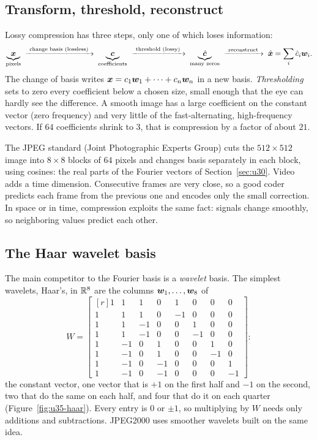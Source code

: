 \subsection{Transform, threshold, reconstruct}

Lossy compression has three steps, only one of which loses information:
\[
  \underbrace{\boldsymbol{x}}_{\text{pixels}}
  \;\xrightarrow{\ \text{change basis (lossless)}\ }\;
  \underbrace{\boldsymbol{c}}_{\text{coefficients}}
  \;\xrightarrow{\ \text{threshold (lossy)}\ }\;
  \underbrace{\hat{\boldsymbol{c}}}_{\text{many zeros}}
  \;\xrightarrow{\ \text{reconstruct}\ }\;
  \hat{\boldsymbol{x}}=\sum_i\hat c_i\boldsymbol{w}_i .
\]
The change of basis writes $\boldsymbol{x}=c_1\boldsymbol{w}_1+\cdots+c_n\boldsymbol{w}_n$ in a new basis. \emph{Thresholding} sets
to zero every coefficient below a chosen size, small enough that the eye can hardly see the
difference. A smooth image has a large coefficient on the constant vector (zero frequency) and
very little of the fast-alternating, high-frequency vectors. If $64$ coefficients shrink to $3$,
that is compression by a factor of about $21$.

The JPEG standard (Joint Photographic Experts Group) cuts the $512\times512$ image into $8\times8$
blocks of $64$ pixels and changes basis separately in each block, using cosines: the real parts
of the Fourier vectors of Section~\ref{sec:u30}. Video adds a time dimension. Consecutive frames
are very close, so a good coder predicts each frame from the previous one and encodes only the
small correction. In space or in time, compression exploits the same fact: signals change
smoothly, so neighboring values predict each other.

\subsection{The Haar wavelet basis}

The main competitor to the Fourier basis is a \emph{wavelet} basis. The simplest wavelets, Haar's,
in $\mathbb{R}^8$ are the columns $\boldsymbol{w}_1,\dots,\boldsymbol{w}_8$ of
\[
  W=\begin{bmatrix*}[r]
  1&1&1&0&1&0&0&0\\
  1&1&1&0&-1&0&0&0\\
  1&1&-1&0&0&1&0&0\\
  1&1&-1&0&0&-1&0&0\\
  1&-1&0&1&0&0&1&0\\
  1&-1&0&1&0&0&-1&0\\
  1&-1&0&-1&0&0&0&1\\
  1&-1&0&-1&0&0&0&-1
  \end{bmatrix*}:
\]
the constant vector, one vector that is $+1$ on the first half and $-1$ on the second, two
that do the same on each half, and four that do it on each quarter
(Figure~\ref{fig:u35-haar}). Every entry is $0$ or $\pm1$, so multiplying by $W$ needs only
additions and subtractions. JPEG2000 uses smoother wavelets built on the same idea.

